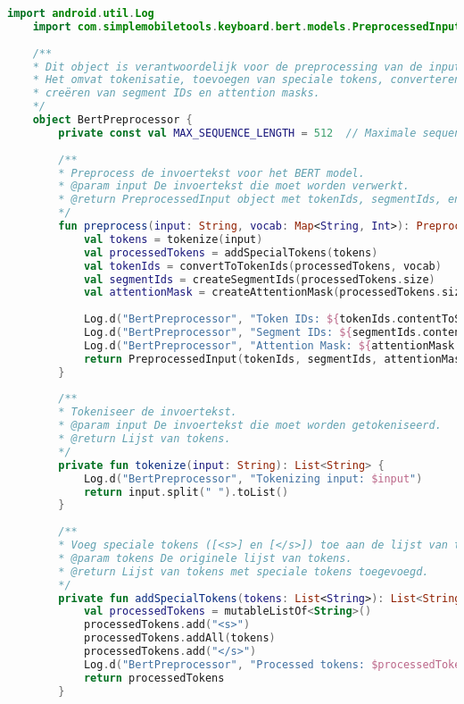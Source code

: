 \begin{lstlisting}[language=Kotlin, caption={Implementatie van BertPreprocessor object}]
    import android.util.Log
    import com.simplemobiletools.keyboard.bert.models.PreprocessedInput
    
    /**
    * Dit object is verantwoordelijk voor de preprocessing van de input voor het BERT model.
    * Het omvat tokenisatie, toevoegen van speciale tokens, converteren van tokens naar hun bijbehorende IDs,
    * creëren van segment IDs en attention masks.
    */
    object BertPreprocessor {
        private const val MAX_SEQUENCE_LENGTH = 512  // Maximale sequentielengte voor BERT model
        
        /**
        * Preprocess de invoertekst voor het BERT model.
        * @param input De invoertekst die moet worden verwerkt.
        * @return PreprocessedInput object met tokenIds, segmentIds, en attentionMask.
        */
        fun preprocess(input: String, vocab: Map<String, Int>): PreprocessedInput {
            val tokens = tokenize(input)
            val processedTokens = addSpecialTokens(tokens)
            val tokenIds = convertToTokenIds(processedTokens, vocab)
            val segmentIds = createSegmentIds(processedTokens.size)
            val attentionMask = createAttentionMask(processedTokens.size)
            
            Log.d("BertPreprocessor", "Token IDs: ${tokenIds.contentToString()}")
            Log.d("BertPreprocessor", "Segment IDs: ${segmentIds.contentToString()}")
            Log.d("BertPreprocessor", "Attention Mask: ${attentionMask.contentToString()}")
            return PreprocessedInput(tokenIds, segmentIds, attentionMask)
        }
        
        /**
        * Tokeniseer de invoertekst.
        * @param input De invoertekst die moet worden getokeniseerd.
        * @return Lijst van tokens.
        */
        private fun tokenize(input: String): List<String> {
            Log.d("BertPreprocessor", "Tokenizing input: $input")
            return input.split(" ").toList()
        }
        
        /**
        * Voeg speciale tokens ([<s>] en [</s>]) toe aan de lijst van tokens.
        * @param tokens De originele lijst van tokens.
        * @return Lijst van tokens met speciale tokens toegevoegd.
        */
        private fun addSpecialTokens(tokens: List<String>): List<String> {
            val processedTokens = mutableListOf<String>()
            processedTokens.add("<s>")
            processedTokens.addAll(tokens)
            processedTokens.add("</s>")
            Log.d("BertPreprocessor", "Processed tokens: $processedTokens")
            return processedTokens
        }
        

\end{lstlisting}
